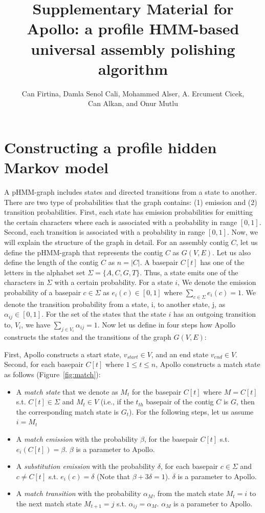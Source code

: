 \documentclass[a4paper]{article}
\title{Supplementary Material for\\ 
Apollo: a profile HMM-based universal assembly polishing algorithm}
\author{%
Can Firtina,
Damla Senol Cali,
Mohammed Alser, 
A. Ercument Cicek,\\ 
Can Alkan, and 
Onur Mutlu
}
\date{}
\begin{document}
\maketitle

\section{Constructing a profile hidden Markov model} \label{suppsec:phmm}

A pHMM-graph includes states and directed transitions from a state to another. There are two type of probabilities that the graph contains: (1) emission and (2) transition probabilities. First, each state has emission probabilities for emitting the certain characters where each is associated with a probability in range $[0,1]$. Second, each transition is associated with a probability in range $[0,1]$. Now, we will explain the structure of the graph in detail. For an assembly contig $C$, let us define the pHMM-graph that represents the contig $C$ as $G(V,E)$. Let us also define the length of the contig $C$ as $n = |C|$. A basepair $C[t]$  has one of the letters in the alphabet set $\Sigma=\{A,C,G,T\}$. Thus, a state emits one of the characters in $\Sigma$ with a certain probability. For a state $i$, We denote the emission probability of a basepair $c \in \Sigma$ as $e_{i}(c) \in [0,1]$ where $\sum\limits_{c \in \Sigma} e_{i}(c) = 1$. We denote the transition probability from a state, i, to another state, j, as $\alpha_{ij} \in [0,1]$. For the set of the states that the state $i$ has an outgoing transition to, $V_{i}$, we have $\sum\limits_{j \in V_{i}} \alpha_{ij} = 1$. Now let us define in four steps how Apollo constructs the states and the transitions of the graph $G(V,E)$:

First, Apollo constructs a start state, $v_{start} \in V$, and an end state $v_{end} \in V$. Second, for each basepair $C[t]$ where $1 \leq t \leq n$, Apollo constructs a match state as follows (Figure~\ref{fig:match}):
\begin{itemize}
    \item A \textit{match state} that we denote as $M_{t}$ for the basepair $C[t]$ where $M = C[t]$ s.t. $C[t] \in \Sigma$ and $M_{t} \in V$ (i.e., if the $t_{th}$ basepair of the contig $C$ is $G$, then the corresponding match state is $G_t$). For the following steps, let us assume $i = M_{t}$
    \item A \textit{match emission} with the probability $\beta$, for the basepair $C[t]$ s.t. $e_i(C[t]) = \beta$. $\beta$ is a parameter to Apollo. 
    \item A \textit{substitution emission} with the probability $\delta$, for each basepair $c \in \Sigma$ and $c \neq C[t]$ s.t. $e_i(c) = \delta$ (Note that $\beta + 3\delta = 1$). $\delta$ is a parameter to Apollo.
    \item A \textit{match transition} with the probability $\alpha_{M}$, from the match state $M_t = i$ to the next match state $M_{t+1} = j$ s.t. $\alpha_{ij} = \alpha_{M}$. $\alpha_{M}$ is a parameter to Apollo.
\end{itemize}
\end{document}
